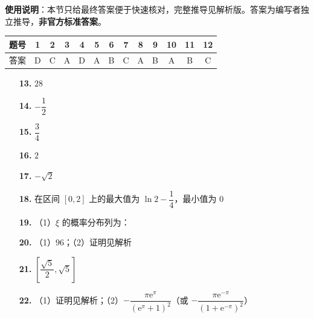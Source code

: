 
\begin{gknotice}
\textbf{使用说明}：本节只给最终答案便于快速核对，完整推导见解析版。答案为编写者独立推导，\textbf{非官方标准答案}。
\end{gknotice}

\begin{center}\begin{tabular}{ccccccccccccc}
\toprule
题号 & 1 & 2 & 3 & 4 & 5 & 6 & 7 & 8 & 9 & 10 & 11 & 12 \\
\midrule
答案 & D & C & A & D & A & B & C & A & B & A & B & C \\
\bottomrule
\end{tabular}\end{center}

\begin{itemize}[leftmargin=2.6em]
  \item[\textbf{13.}] $28$
  \item[\textbf{14.}] $-\dfrac{1}{2}$
  \item[\textbf{15.}] $\dfrac{3}{4}$
  \item[\textbf{16.}] $2$
\end{itemize}

\begin{itemize}[leftmargin=2.6em]
  \item[\textbf{17.}] $-\sqrt{2}$
  \item[\textbf{18.}] 在区间 $[0,2]$ 上的最大值为 $\ln 2-\dfrac{1}{4}$，最小值为 0
  \item[\textbf{19.}] （1）$\xi$ 的概率分布列为：
  \item[\textbf{20.}] （1）$96$；（2）证明见解析
  \item[\textbf{21.}] $\left[\dfrac{\sqrt{5}}{2}, \sqrt{5}\right]$
  \item[\textbf{22.}] （1）证明见解析；（2）$-\dfrac{\pi\mathrm{e}^\pi}{(\mathrm{e}^\pi+1)^2}$（或 $-\dfrac{\pi\mathrm{e}^{-\pi}}{(1+\mathrm{e}^{-\pi})^2}$）
\end{itemize}
